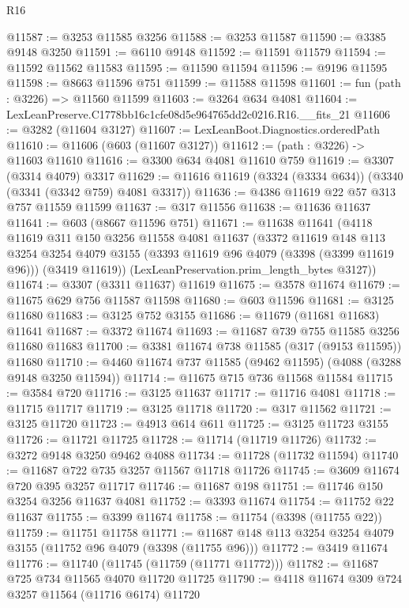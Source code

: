 \begin{lexlean}{R16}
\begin{coremodule}
@11587 := @3253 @11585 @3256
@11588 := @3253 @11587
@11590 := @3385 @9148 @3250
@11591 := @6110 @9148
@11592 := @11591 @11579
@11594 := @11592 @11562 @11583
@11595 := @11590 @11594
@11596 := @9196 @11595
@11598 := @8663 @11596 @751
@11599 := @11588 @11598
@11601 := fun (path : @3226) => @11560 @11599
@11603 := @3264 @634 @4081
@11604 := LexLeanPreserve.C1778bb16c1cfe08d5e964765dd2c0216.R16.__fits_21
@11606 := @3282 (@11604 @3127)
@11607 := LexLeanBoot.Diagnostics.orderedPath
@11610 := @11606 (@603 (@11607 @3127))
@11612 := (path : @3226) -> @11603 @11610
@11616 := @3300 @634 @4081 @11610 @759
@11619 := @3307 (@3314 @4079) @3317
@11629 := @11616 @11619 (@3324 (@3334 @634)) (@3340 (@3341 (@3342 @759) @4081 @3317))
@11636 := @4386 @11619 @22 @57 @313 @757 @11559 @11599
@11637 := @317 @11556
@11638 := @11636 @11637
@11641 := @603 (@8667 @11596 @751)
@11671 := @11638
    @11641
    (@4118
      @11619
      @311
      @150
      @3256
      @11558
      @4081
      @11637
      (@3372
        @11619
        @148
        @113
        @3254
        @3254
        @4079
        @3155
        (@3393 @11619 @96 @4079 (@3398 (@3399 @11619 @96)))
        (@3419 @11619))
      (LexLeanPreservation.prim_length_bytes @3127))
@11674 := @3307 (@3311 @11637) @11619
@11675 := @3578 @11674
@11679 := @11675 @629 @756 @11587 @11598
@11680 := @603 @11596
@11681 := @3125 @11680
@11683 := @3125 @752 @3155
@11686 := @11679 (@11681 @11683) @11641
@11687 := @3372 @11674
@11693 := @11687 @739 @755 @11585 @3256 @11680 @11683
@11700 := @3381 @11674 @738 @11585 (@317 (@9153 @11595)) @11680
@11710 := @4460 @11674 @737 @11585 (@9462 @11595) (@4088 (@3288 @9148 @3250 @11594))
@11714 := @11675 @715 @736 @11568 @11584
@11715 := @3584 @720
@11716 := @3125 @11637
@11717 := @11716 @4081
@11718 := @11715 @11717
@11719 := @3125 @11718
@11720 := @317 @11562
@11721 := @3125 @11720
@11723 := @4913 @614 @611
@11725 := @3125 @11723 @3155
@11726 := @11721 @11725
@11728 := @11714 (@11719 @11726)
@11732 := @3272 @9148 @3250 @9462 @4088
@11734 := @11728 (@11732 @11594)
@11740 := @11687 @722 @735 @3257 @11567 @11718 @11726
@11745 := @3609 @11674 @720 @395 @3257 @11717
@11746 := @11687 @198
@11751 := @11746 @150 @3254 @3256 @11637 @4081
@11752 := @3393 @11674
@11754 := @11752 @22 @11637
@11755 := @3399 @11674
@11758 := @11754 (@3398 (@11755 @22))
@11759 := @11751 @11758
@11771 := @11687 @148 @113 @3254 @3254 @4079 @3155 (@11752 @96 @4079 (@3398 (@11755 @96)))
@11772 := @3419 @11674
@11776 := @11740 (@11745 (@11759 (@11771 @11772)))
@11782 := @11687 @725 @734 @11565 @4070 @11720 @11725
@11790 := @4118 @11674 @309 @724 @3257 @11564 (@11716 @6174) @11720

\end{coremodule}
\end{lexlean}
